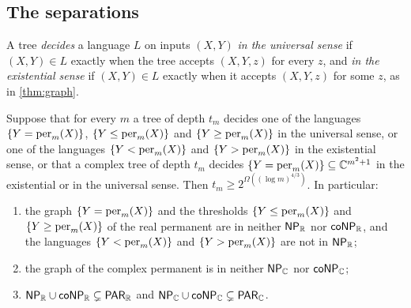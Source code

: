 \subsection{The separations}\label{sec:universal-separations}

A tree \emph{decides} a language $L$ on inputs $(X,Y)$ \emph{in the universal sense} if $(X,Y)\in L$ exactly when the tree accepts $(X,Y,z)$ for every $z$, and \emph{in the existential sense} if $(X,Y)\in L$ exactly when it accepts $(X,Y,z)$ for some $z$, as in \cref{thm:graph}.

\begin{corollary}\label{cor:conp}
Suppose that for every $m$ a tree of depth $t_m$ decides one of the languages $\{Y=\operatorname{per}_m(X)\}$, $\{Y\le\operatorname{per}_m(X)\}$ and $\{Y\ge\operatorname{per}_m(X)\}$ in the universal sense, or one of the languages $\{Y<\operatorname{per}_m(X)\}$ and $\{Y>\operatorname{per}_m(X)\}$ in the existential sense, or that a complex tree of depth $t_m$ decides $\{Y=\operatorname{per}_m(X)\}\subseteq\mathbb{C}^{m^2+1}$ in the existential or in the universal sense. Then $t_m\ge2^{\Omega((\log m)^{4/3})}$. In particular:
\begin{enumerate}[label=\textup{(\alph*)}]
\item the graph $\{Y=\operatorname{per}_m(X)\}$ and the thresholds $\{Y\le\operatorname{per}_m(X)\}$ and $\{Y\ge\operatorname{per}_m(X)\}$ of the real permanent are in neither $\textsf{\upshape NP}_{\mathbb{R}}$ nor $\textsf{\upshape coNP}_{\mathbb{R}}$, and the languages $\{Y<\operatorname{per}_m(X)\}$ and $\{Y>\operatorname{per}_m(X)\}$ are not in $\textsf{\upshape NP}_{\mathbb{R}}$;
\item the graph of the complex permanent is in neither $\textsf{\upshape NP}_{\mathbb{C}}$ nor $\textsf{\upshape coNP}_{\mathbb{C}}$;
\item $\textsf{\upshape NP}_{\mathbb{R}}\cup\textsf{\upshape coNP}_{\mathbb{R}}\subsetneq\textsf{\upshape PAR}_{\mathbb{R}}$ and $\textsf{\upshape NP}_{\mathbb{C}}\cup\textsf{\upshape coNP}_{\mathbb{C}}\subsetneq\textsf{\upshape PAR}_{\mathbb{C}}$.
\end{enumerate}
\end{corollary}

